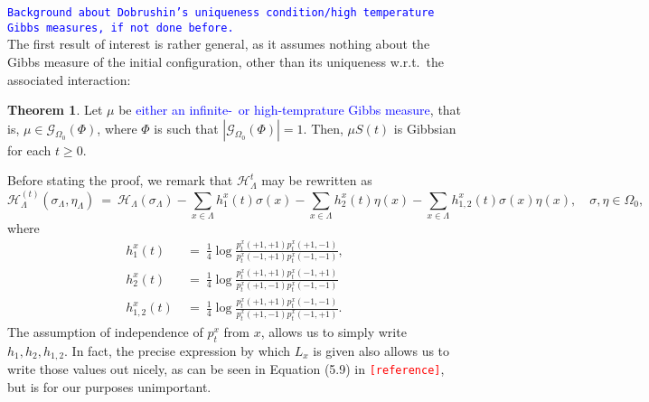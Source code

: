 \documentclass[12pt]{article}
\newcommand{\G}{\mathcal{G}}
\renewcommand{\H}{\mathcal{H}}
\newcommand{\1}{\mathbbm{1}}
\newcommand{\5}{\vspace{0.5cm}}
\theoremstyle{definition}
\newtheorem{thm}{Theorem}[section]
\begin{document}
\textcolor{blue}{\texttt{Background about Dobrushin's uniqueness condition/high temperature Gibbs measures, if not done before.}}\\

The first result of interest is rather general, as it assumes nothing about the Gibbs measure of the initial configuration, other than its uniqueness w.r.t.~the associated interaction:

\begin{thm}
Let $\mu$ be \textcolor{blue}{either an infinite-~or high-temprature Gibbs measure}, that is, $\mu\in\G_{\Omega_0}(\Phi)$, where $\Phi$ is such that $|\G_{\Omega_0}(\Phi)|=1$. Then, $\mu S(t)$ is Gibbsian for each $t\geq 0$.
\end{thm}

Before stating the proof, we remark that $\H_\Lambda^t$ may be rewritten as
$$\H_\Lambda^{(t)}(\sigma_\Lambda,\eta_\Lambda) ~=~ \H_\Lambda(\sigma_\Lambda) - \sum_{x\in\Lambda}h_1^x(t)\sigma(x) - \sum_{x\in\Lambda}h_2^x(t)\eta(x) - \sum_{x\in\Lambda}h_{1,2}^x(t)\sigma(x)\eta(x), \quad \sigma,\eta\in\Omega_0,$$
where 
\begin{align*}
h_1^x(t) ~&=~ \frac{1}{4}\log\frac{p_t^x(+1,+1)p_t^x(+1,-1)}{p_t^x(-1,+1)p_t^x(-1,-1)}, \\
h_2^x(t) ~&=~ \frac{1}{4}\log\frac{p_t^x(+1,+1)p_t^x(-1,+1)}{p_t^x(+1,-1)p_t^x(-1,-1)} \\
h_{1,2}^x(t) ~&=~ \frac{1}{4}\log\frac{p_t^{x}(+1,+1)p_t^x(-1,-1)}{p_t^x{(+1,-1)}p_t^{x}(-1,+1)}.
\end{align*}
The assumption of independence of $p_t^x$ from $x$, allows us to simply write $h_1,h_2,h_{1,2}$. In fact, the precise expression by which $L_x$ is given also allows us to write those values out nicely, as can be seen in Equation (5.9) in \textcolor{red}{\texttt{[reference]}}, but is for our purposes unimportant.
\end{document}
